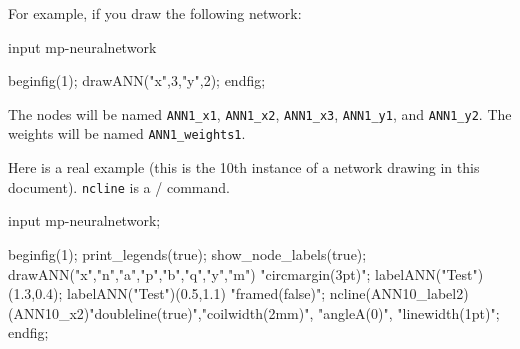 \documentclass[english]{ltxdoc}
\begin{document}
For example, if you draw the following network:
\begin{mpcode}
input mp-neuralnetwork

beginfig(1);
drawANN("x",3,"y",2);
endfig;
\end{mpcode}

The nodes will be named \texttt{ANN1\_x1}, \texttt{ANN1\_x2}, \texttt{ANN1\_x3},
\texttt{ANN1\_y1}, and \texttt{ANN1\_y2}. The weights will be named
\texttt{ANN1\_weights1}.

Here is a real example (this is the 10th instance of a network drawing in this
document). \lstinline+ncline+ is a \MO/ command. 
\begin{ExempleMP}
input mp-neuralnetwork;

beginfig(1);
  print_legends(true);
  show_node_labels(true);
  drawANN("x","n","a","p","b","q","y","m") "circmargin(3pt)";
  labelANN("Test")(1.3,0.4);
  labelANN("Test")(0.5,1.1) "framed(false)";
  ncline(ANN10_label2)(ANN10_x2)"doubleline(true)","coilwidth(2mm)",
  "angleA(0)", 
  "linewidth(1pt)";
endfig;
\end{ExempleMP}


\printbibliography
\printindex
\end{document}
